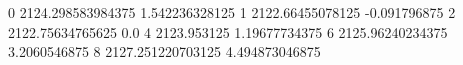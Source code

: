 0 2124.298583984375 1.542236328125
1 2122.66455078125 -0.091796875
2 2122.75634765625 0.0
4 2123.953125 1.19677734375
6 2125.96240234375 3.2060546875
8 2127.251220703125 4.494873046875
